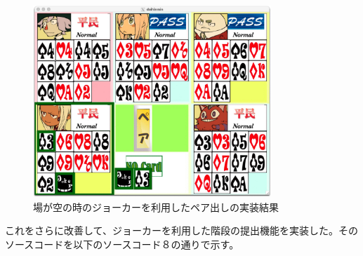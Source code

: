\documentclass[]{jsarticle}
\begin{document}
\begin{figure}[h]
  \centering
  \includegraphics[width=0.8\textwidth]{./kadai10pairfree.jpg}
  \caption{場が空の時のジョーカーを利用したペア出しの実装結果}
\end{figure}

\noindent これをさらに改善して、ジョーカーを利用した階段の提出機能を実装した。そのソースコードを以下のソースコード８の通りで示す。\\
\end{document}
